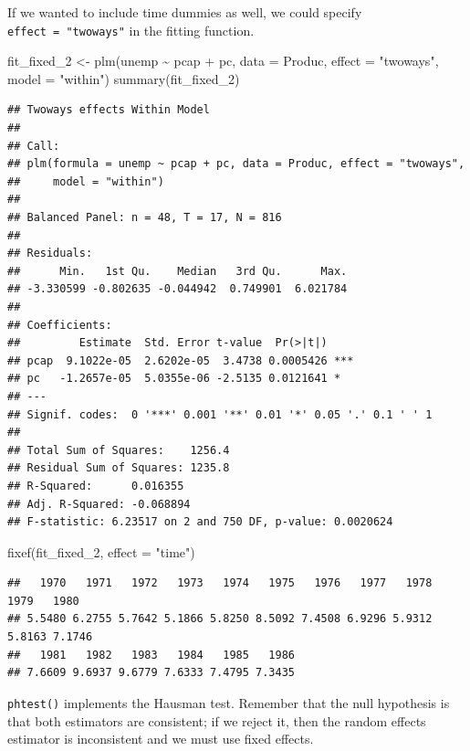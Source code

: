 \documentclass[
  12pt,
  oneside,openany]{book}
\newenvironment{Shaded}{\begin{snugshade}}{\end{snugshade}}
\newcommand{\AttributeTok}[1]{\textcolor[rgb]{0.77,0.63,0.00}{#1}}
\newcommand{\FunctionTok}[1]{\textcolor[rgb]{0.00,0.00,0.00}{#1}}
\newcommand{\NormalTok}[1]{#1}
\newcommand{\OtherTok}[1]{\textcolor[rgb]{0.56,0.35,0.01}{#1}}
\newcommand{\SpecialCharTok}[1]{\textcolor[rgb]{0.00,0.00,0.00}{#1}}
\newcommand{\StringTok}[1]{\textcolor[rgb]{0.31,0.60,0.02}{#1}}
\begin{document}
If we wanted to include time dummies as well, we could specify \texttt{effect\ =\ "twoways"} in the fitting function.

\begin{Shaded}
\begin{Highlighting}[]
\NormalTok{fit\_fixed\_2 }\OtherTok{\textless{}{-}} \FunctionTok{plm}\NormalTok{(unemp }\SpecialCharTok{\textasciitilde{}}\NormalTok{ pcap }\SpecialCharTok{+}\NormalTok{ pc,}
                   \AttributeTok{data =}\NormalTok{ Produc,}
                   \AttributeTok{effect =} \StringTok{"twoways"}\NormalTok{,}
                   \AttributeTok{model =} \StringTok{"within"}\NormalTok{)}
\FunctionTok{summary}\NormalTok{(fit\_fixed\_2)}
\end{Highlighting}
\end{Shaded}

\begin{verbatim}
## Twoways effects Within Model
## 
## Call:
## plm(formula = unemp ~ pcap + pc, data = Produc, effect = "twoways", 
##     model = "within")
## 
## Balanced Panel: n = 48, T = 17, N = 816
## 
## Residuals:
##      Min.   1st Qu.    Median   3rd Qu.      Max. 
## -3.330599 -0.802635 -0.044942  0.749901  6.021784 
## 
## Coefficients:
##         Estimate  Std. Error t-value  Pr(>|t|)    
## pcap  9.1022e-05  2.6202e-05  3.4738 0.0005426 ***
## pc   -1.2657e-05  5.0355e-06 -2.5135 0.0121641 *  
## ---
## Signif. codes:  0 '***' 0.001 '**' 0.01 '*' 0.05 '.' 0.1 ' ' 1
## 
## Total Sum of Squares:    1256.4
## Residual Sum of Squares: 1235.8
## R-Squared:      0.016355
## Adj. R-Squared: -0.068894
## F-statistic: 6.23517 on 2 and 750 DF, p-value: 0.0020624
\end{verbatim}

\begin{Shaded}
\begin{Highlighting}[]
\FunctionTok{fixef}\NormalTok{(fit\_fixed\_2, }\AttributeTok{effect =} \StringTok{"time"}\NormalTok{)}
\end{Highlighting}
\end{Shaded}

\begin{verbatim}
##   1970   1971   1972   1973   1974   1975   1976   1977   1978   1979   1980 
## 5.5480 6.2755 5.7642 5.1866 5.8250 8.5092 7.4508 6.9296 5.9312 5.8163 7.1746 
##   1981   1982   1983   1984   1985   1986 
## 7.6609 9.6937 9.6779 7.6333 7.4795 7.3435
\end{verbatim}

\texttt{phtest()} implements the Hausman test. Remember that the null hypothesis is that both estimators are consistent; if we reject it, then the random effects estimator is inconsistent and we must use fixed effects.
\end{document}
